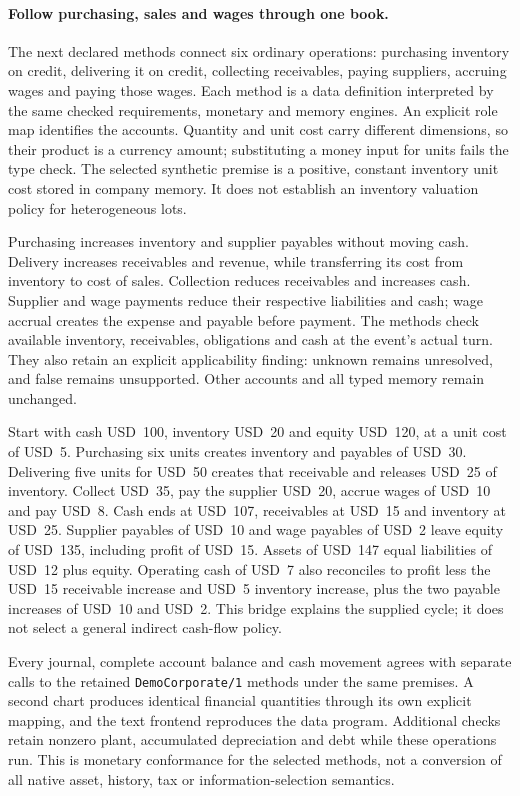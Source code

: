 \paragraph{Follow purchasing, sales and wages through one book.}
The next declared methods connect six ordinary operations: purchasing inventory
on credit, delivering it on credit, collecting receivables, paying suppliers,
accruing wages and paying those wages. Each method is a data definition interpreted
by the same checked requirements, monetary and memory engines. An explicit role
map identifies the accounts. Quantity and unit cost carry different dimensions,
so their product is a currency amount; substituting a money input for units fails
the type check. The selected synthetic premise is a positive, constant inventory
unit cost stored in company memory. It does not establish an inventory valuation
policy for heterogeneous lots.

Purchasing increases inventory and supplier payables without moving cash.
Delivery increases receivables and revenue, while transferring its cost from
inventory to cost of sales. Collection reduces receivables and increases cash.
Supplier and wage payments reduce their respective liabilities and cash; wage
accrual creates the expense and payable before payment. The methods check available
inventory, receivables, obligations and cash at the event's actual turn. They also
retain an explicit applicability finding: unknown remains unresolved, and false
remains unsupported. Other accounts and all typed memory remain unchanged.

Start with cash USD~100, inventory USD~20 and equity USD~120, at a unit cost of
USD~5. Purchasing six units creates inventory and payables of USD~30. Delivering
five units for USD~50 creates that receivable and releases USD~25 of inventory.
Collect USD~35, pay the supplier USD~20, accrue wages of USD~10 and pay USD~8.
Cash ends at USD~107, receivables at USD~15 and inventory at USD~25. Supplier
payables of USD~10 and wage payables of USD~2 leave equity of USD~135, including
profit of USD~15. Assets of USD~147 equal liabilities of USD~12 plus equity.
Operating cash of USD~7 also reconciles to profit less the USD~15 receivable
increase and USD~5 inventory increase, plus the two payable increases of USD~10
and USD~2. This bridge explains the supplied cycle; it does not select a general
indirect cash-flow policy.

Every journal, complete account balance and cash movement agrees with separate
calls to the retained \texttt{DemoCorporate/1} methods under the same premises.
A second chart produces identical financial quantities through its own explicit
mapping, and the text frontend reproduces the data program. Additional checks
retain nonzero plant, accumulated depreciation and debt while these operations
run. This is monetary conformance for the selected methods, not a conversion of
all native asset, history, tax or information-selection semantics.

